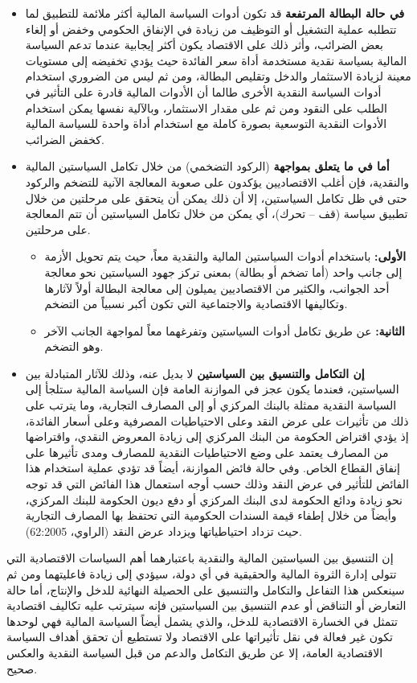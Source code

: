 \documentclass[10pt,a4paper]{report}
\begin{document}
\begin{doublespacing}
\begin{itemize}
	\item \textbf{في حالة البطالة المرتفعة} قد تكون أدوات السياسة المالية أكثر ملائمة للتطبيق لما تتطلبه عملية التشغيل أو التوظيف من زيادة في الإنفاق الحكومي وخفض أو إلغاء بعض الضرائب، وأثر ذلك على الاقتصاد يكون أكثر إيجابية عندما تدعم السياسة المالية بسياسة نقدية مستخدمة أداة سعر الفائدة حيث يؤدي تخفيضه إلى مستويات معينة لزيادة الاستثمار والدخل وتقليص البطالة، ومن ثم ليس من الضروري استخدام أدوات السياسة النقدية الأخرى طالما أن الأدوات المالية قادرة على التأثير في الطلب على النقود ومن ثم على مقدار الاستثمار، وبالآلية نفسها يمكن استخدام الأدوات النقدية التوسعية بصورة كاملة مع استخدام أداة واحدة للسياسة المالية كخفض الضرائب.
	\item \textbf{أما في ما يتعلق بمواجهة} (الركود التضخمي) من خلال تكامل السياستين المالية والنقدية، فإن أغلب الاقتصاديين يؤكدون على صعوبة المعالجة الآنية للتضخم والركود حتى في ظل تكامل السياستين، إلا أن ذلك يمكن أن يتحقق على مرحلتين من خلال تطبيق سياسة (قف – تحرك)، أي يمكن من خلال تكامل السياستين أن تتم المعالجة على مرحلتين.
	\begin{itemize}
		\item \textbf{الأولى:} باستخدام أدوات السياستين المالية والنقدية معاً، حيث يتم تحويل الأزمة إلى جانب واحد (أما تضخم أو بطالة) بمعنى تركز جهود السياستين نحو معالجة أحد الجوانب، والكثير من الاقتصاديين يميلون إلى معالجة البطالة أولاً لآثارها وتكاليفها الاقتصادية والاجتماعية التي تكون أكبر نسبياً من التضخم.
		\item \textbf{الثانية:} عن طريق تكامل أدوات السياستين وتفرغهما معاً لمواجهة الجانب الآخر وهو التضخم.
	\end{itemize}
	\item \textbf{إن التكامل والتنسيق بين السياستين} لا بديل عنه، وذلك للآثار المتبادلة بين السياستين، فعندما يكون عجز في الموازنة العامة فإن السياسة المالية ستلجأ إلى السياسة النقدية ممثلة بالبنك المركزي أو إلى المصارف التجارية، وما يترتب على ذلك من تأثيرات على عرض النقد وعلى الاحتياطيات المصرفية وعلى أسعار الفائدة، إذ يؤدي اقتراض الحكومة من البنك المركزي إلى زيادة المعروض النقدي، واقتراضها من المصارف يعتمد على وضع الاحتياطيات النقدية للمصارف ومدى تأثيرها على إنفاق القطاع الخاص.  
	وفي حالة فائض الموازنة، أيضاً قد تؤدي عملية استخدام هذا الفائض للتأثير في عرض النقد وذلك حسب أوجه استعمال هذا الفائض التي قد توجه نحو زيادة ودائع الحكومة لدى البنك المركزي أو دفع ديون الحكومة للبنك المركزي، وأيضاً من خلال إطفاء قيمة السندات الحكومية التي تحتفظ بها المصارف التجارية حيث تزداد احتياطياتها ويزداد عرض النقد ({الراوي، 62:2005}).
\end{itemize}

إن التنسيق بين السياستين المالية والنقدية باعتبارهما أهم السياسات الاقتصادية التي تتولى إدارة الثروة المالية والحقيقية في أي دولة، سيؤدي إلى زيادة فاعليتهما ومن ثم سينعكس هذا التفاعل والتكامل والتنسيق على الحصيلة النهائية للدخل والإنتاج، أما حالة التعارض أو التناقض أو عدم التنسيق بين السياستين فإنه سيترتب عليه تكاليف اقتصادية تتمثل في الخسارة الاقتصادية للدخل، والذي يشمل أيضاً السياسة المالية فهي لوحدها تكون غير فعالة في نقل تأثيراتها على الاقتصاد ولا تستطيع أن تحقق أهداف السياسة الاقتصادية العامة، إلا عن طريق التكامل والدعم من قبل السياسة النقدية والعكس صحيح.

\end{doublespacing}
\end{document}
